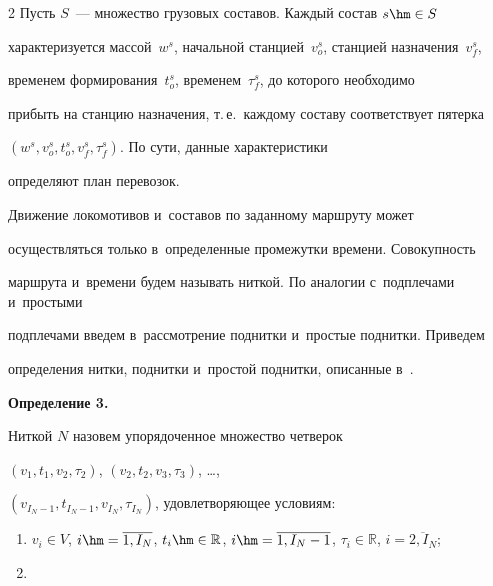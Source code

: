 \begin{multicols}{2}
Пусть $S$~--- множество грузовых составов. Каж\-дый состав $s \hm\in S$ 


характеризуется массой~$w^s$, начальной станцией~$v^s_o$, станцией назначения~$v^s_f$, 


временем формирования~$t^s_o$, временем~$\tau^s_f$, до которого необходимо 


прибыть на станцию назначения, т.\,е.\ каждому составу соответствует пятерка


 $(w^s, v^s_o, t^s_o, v^s_f, \tau^s_f)$. По сути, данные характеристики 


 определяют план перевозок.





Движение локомотивов и~составов по заданному маршруту может 


осуществляться только в~определенные промежутки времени. Совокупность 


маршру\-та и~времени будем называть ниткой. По аналогии с~подплечами и~простыми 


подплечами введем в~рассмотрение поднитки и~простые поднитки. Приведем 


определения нитки, поднитки и~простой поднитки, описанные в~\cite{AzanovBuyanov}.





\smallskip





\noindent


\textbf{Определение 3.}\


    Ниткой $N$ назовем упорядоченное множество четверок 


    $(v_1, t_1, v_2, \tau_2)$, $(v_2, t_2, v_3, \tau_3)$, \ldots, 


    $(v_{I_N-1}, t_{I_N-1}, v_{I_N}, \tau_{I_N})$, удовлетворяющее условиям:


    \begin{enumerate}[(1)]





    \item


        $v_i \in V$, $i \hm= \overline{1, I_N}$, $t_i\hm \in \mathbb{R}$, $i \hm= \overline{1, I_N-1}$, $\tau_i \in \mathbb{R}$, $i = \overline{2, I_N}$;





    \item



\end{enumerate}
\end{multicols}
